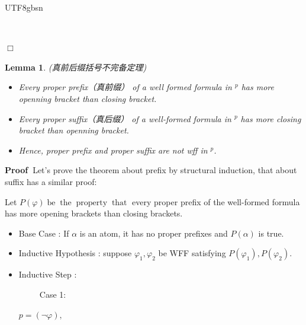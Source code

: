 \documentclass{article}
\newtheorem{lemma}{Lemma}
\newcommand{\nonconverted}[1]{\mbox{}}
\begin{document}
\begin{CJK*}{UTF8}{gbsn}
\begin{itemize}
  \ 
\end{itemize}
\hspace*{\fill}$\Box$\medskip

\begin{otherlanguage}{chinese}
  \begin{lemma}
    (真前后缀括号不完备定理)
    \begin{itemize}
      \renewcommand{\labelitemi}{$\bullet$}\renewcommand{\labelitemii}{$\bullet$}\renewcommand{\labelitemiii}{$\bullet$}\renewcommand{\labelitemiv}{$\bullet$}\item
      Every proper prefix（真前缀） of a well formed formula in
      $\nonconverted{cal*L}^p$ has more openning bracket than closing bracket.
      
      \item Every proper suffix（真后缀） of a well-formed formula in
      $\nonconverted{cal*L}^p$ has more closing bracket than openning bracket.
      
      \item Hence, proper prefix and proper suffix are not wff in
      $\nonconverted{cal*L}^p$.
    \end{itemize}
  \end{lemma}
\end{otherlanguage}

\noindent\textbf{Proof\ }Let's prove the theorem about prefix by structural
induction, that about suffix has a similar proof:

Let $P (\varphi)
\ensuremath{\operatorname{be}}\ensuremath{\operatorname{the}}\ensuremath{\operatorname{property}}\ensuremath{\operatorname{that}}$
every proper prefix of the well-formed formula {\varphi} has more opening
brackets than closing brackets.
\begin{itemize}
  \renewcommand{\labelitemi}{$\bullet$}\renewcommand{\labelitemii}{$\bullet$}\renewcommand{\labelitemiii}{$\bullet$}\renewcommand{\labelitemiv}{$\bullet$}\item
  Base Case : If $\alpha$ is an atom, it has no proper prefixes and $P
  (\alpha)$ is true.
  
  \item Inductive Hypothesis : suppose $\varphi_1, \varphi_2$ be WFF
  satisfying $P (\varphi_1), P (\varphi_2)$.
  
  \item Inductive Step :
  
  \ \ \ \ \ Case 1:
  
  $p = (\neg \varphi),$
  

\end{itemize}
\end{CJK*}
\end{document}
